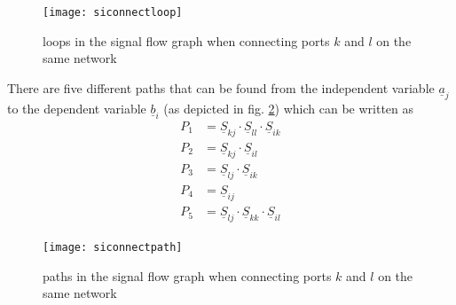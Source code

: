 \documentclass[10pt]{report}
\begin{document}
\begin{figure}[ht]
\begin{center}
\texttt{[image: siconnectloop]}
\end{center}
\caption{loops in the signal flow graph when connecting ports $k$ and $l$ on the same network}
\label{fig:siconnectloop}
\end{figure}
\FloatBarrier

There are five different paths that can be found from the independent
variable $\underline{a}_{j}$ to the dependent variable
$\underline{b}_{i}$ (as depicted in fig. \ref{fig:siconnectpath})
which can be written as
\begin{align}
P_{1} &= \underline{S}_{kj}\cdot \underline{S}_{ll}\cdot \underline{S}_{ik}\\
P_{2} &= \underline{S}_{kj}\cdot \underline{S}_{il}\\
P_{3} &= \underline{S}_{lj}\cdot \underline{S}_{ik}\\
P_{4} &= \underline{S}_{ij}\\
P_{5} &= \underline{S}_{lj}\cdot \underline{S}_{kk}\cdot \underline{S}_{il}
\end{align}

\begin{figure}[ht]
\begin{center}
\texttt{[image: siconnectpath]}
\end{center}
\caption{paths in the signal flow graph when connecting ports $k$ and $l$ on the same network}
\label{fig:siconnectpath}
\end{figure}
\FloatBarrier
\end{document}
